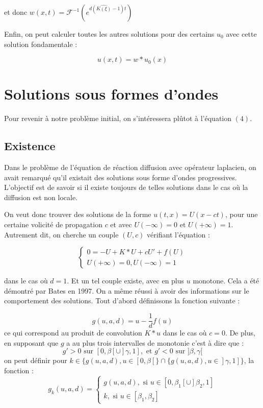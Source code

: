 \documentclass{article}
\begin{document}
et donc $w(x,t) = \mathcal{F}^{-1} (e^{d(\widehat{K(\xi)} -1)t})$\newline 

Enfin, on peut calculer toutes les autres solutions pour des certains $u_0$ avec cette solution fondamentale :

\begin{equation}
u(x,t) = w*u_0(x)
\end{equation}



\section{Solutions sous formes d'ondes}
Pour revenir à notre problème initial, on s'intéressera plûtot à l'équation $(4)$.

\subsection{Existence}
Dans le problème de l'équation de réaction diffusion avec opérateur laplacien, on avait remarqué qu'il existait des solutions sous forme d'ondes progressives. L'objectif est de savoir si il existe toujours de telles solutions dans le cas où la diffusion est non locale.

On veut donc trouver des solutions de la forme $u(t,x) = U(x-ct) $, pour une certaine volicité de propagation $c$ et avec $U(-\infty) = 0$ et $U(+\infty) = 1$. Autrement dit, on cherche un couple $(U,c)$ vérifiant l'équation :

\begin{equation}
\left\{
\begin{array}{cc}
0 = -U + K*U + cU' + f(U) \\
U(+\infty) = 0 , U(-\infty) = 1
\end{array}
\right.
\end{equation}

\noindent dans le cas où $d=1$.
Et un tel couple existe, avec en plus $u$ monotone. Cela a été démontré par Bates en 1997. On a même réussi à avoir des informations sur le comportement des solutions. Tout d'abord définissons la fonction suivante : 

\begin{equation}
	g(u,a,d) = u - \frac{1}{d} f(u)
\end{equation}
ce qui correspond au produit de convolution $K*u$ dans le cas où $c=0$. De plus, en supposant que $g$ a au plus trois intervalles de monotonie c'est à dire que :
\begin{equation*}
g'>0 \text{ sur } [0,\beta[\cup]\gamma,1], \text{ et } g'<0 \text{ sur } ]\beta,\gamma[
\end{equation*}
on peut définir pour $k \in \{ g(u,a,d), u \in [0,\beta[\} \cap \{ g(u,a,d), u \in ]\gamma, 1]\}$, la fonction : 
\begin{equation*}
	g_k(u,a,d) = \left \{ \begin{array}{cc} g(u,a,d), \text{ si } u \in  [0,\beta_1[\cup]\beta_2,1] \\ k , \text{ si } u \in [\beta_1,\beta_2] \end{array} \right.
\end{equation*}
\end{document}
